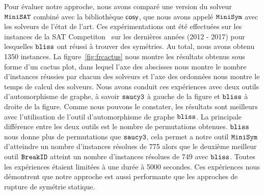 Pour évaluer notre approche, nous avons comparé une version du solveur $\texttt{MiniSAT}$ combiné avec la bibliothèque $\textsf{cosy}$, que nous avons appelé $\texttt{MiniSym}$ avec les solveurs de l'état de l'art.
Ces expérimentations ont été effectuées sur les instances de la SAT Competiton~\cite{jarvisalo2012international} sur les dernières années (2012 - 2017) pour lesquelles $\texttt{bliss}$ ont réussi à trouver des symétries. Au total, nous avons obtenu 1350 instances.
La figure~\ref{fig:frcactus} nous montre les résultats obtenus sous forme d'un cactus plot, 
dans lequel l'axe des abscisses nous montre le nombre d'instances réussies par chacun des solveurs et l'axe des ordonnées nous montre le temps de calcul des solveurs.
Nous avons conduit ces expériences avec deux outils d'automorphisme de graphe, à savoir 
$\texttt{saucy3}$ à gauche de la figure et $\texttt{bliss}$ à droite de la figure. 
Comme nous pouvons le constater, les résultats sont meilleurs  avec l'utilisation de l'outil d'automorphisme de 
graphe $\texttt{bliss}$. La principale différence entre les deux outils est le nombre de permutations obtenues.
$\texttt{bliss}$ nous donne plus de permutations que $\texttt{saucy3}$, cela permet a notre outil $\texttt{MiniSym}$ d'atteindre 
un nombre d'instances résolues de 775 alors que le deuxième meilleur outil $\texttt{BreakID}$ atteint un nombre d'instances résolues de 749 avec $\texttt{bliss}$. Toutes les expériences étaient limitées à une durée à 5000 secondes.
Ces expériences nous démontrent que notre approche est aussi performante que les approches de rupture de symétrie statique.
